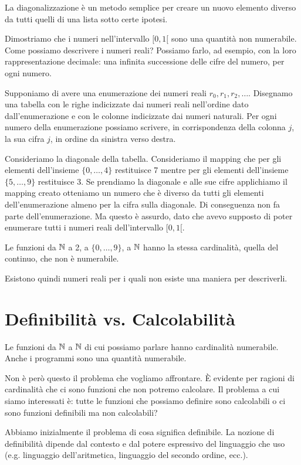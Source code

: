 La diagonalizzazione è un metodo semplice per creare un nuovo elemento diverso da tutti quelli di
una lista sotto certe ipotesi.

Dimostriamo che i numeri nell'intervallo $[0,1[$ sono una quantità non numerabile. Come possiamo
descrivere i numeri reali? Possiamo farlo, ad esempio, con la loro rappresentazione decimale: una
infinita successione delle cifre del numero, per ogni numero.

Supponiamo di avere una enumerazione dei numeri reali $r_{0}, r_{1}, r_{2}, \dotsc$. Disegnamo una
tabella con le righe indicizzate dai numeri reali nell'ordine dato dall'enumerazione e con le
colonne indicizzate dai numeri naturali. Per ogni numero della enumerazione possiamo scrivere, in
corrispondenza della colonna $j$, la sua cifra $j$, in ordine da sinistra verso destra. 

Consideriamo la diagonale della tabella. Consideriamo il mapping che per gli elementi dell'insieme
$\{0,\dotsc,4\}$ restituisce 7 mentre per gli elementi dell'insieme $\{5,\dotsc,9\}$ restituisce 3.
Se prendiamo la diagonale e alle sue cifre applichiamo il mapping creato otteniamo un numero che è
diverso da tutti gli elementi dell'enumerazione almeno per la cifra sulla diagonale. Di conseguenza
non fa parte dell'enumerazione. Ma questo è assurdo, dato che avevo supposto di poter enumerare
tutti i numeri reali dell'intervallo $[0,1[$.

Le funzioni da $\mathbb{N}$ a 2, a $\{0,\dotsc,9\}$, a $\mathbb{N}$ hanno la stessa cardinalità, quella del
continuo, che non è numerabile.

Esistono quindi numeri reali per i quali non esiste una maniera per descriverli.

\section{Definibilità vs. Calcolabilità}

Le funzioni da $\mathbb{N}$ a $\mathbb{N}$ di cui possiamo parlare hanno cardinalità numerabile. Anche i programmi sono
una quantità numerabile.

Non è però questo il problema che vogliamo affrontare. È evidente per ragioni di cardinalità che
ci sono funzioni che non potremo calcolare. Il problema a cui siamo interessati è: tutte le
funzioni che possiamo definire sono calcolabili o ci sono funzioni definibili ma non calcolabili?

Abbiamo inizialmente il problema di cosa significa definibile. La nozione di definibilità dipende
dal contesto e dal potere espressivo del linguaggio che uso (e.g. linguaggio dell'aritmetica, linguaggio
del secondo ordine, ecc.).

